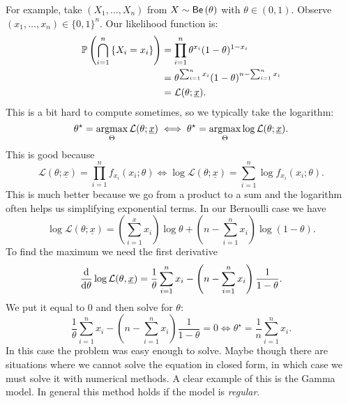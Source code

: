 \documentclass[12pt]{report}
\begin{document}
For example, take $(X_{1},\ldots,X_{n})$ from $X\sim\mathsf{Be}\left(\theta\right)$ with $\theta\in(0,1)$. Observe $(x_{1},\ldots,x_{n})\in\{0,1\}^{n}$. Our likelihood function is:
\begin{align*}
	\mathbb{P}\left(\bigcap_{i=1}^{n}\left\{X_{i}=x_{i}\right\}\right)&=\prod_{i=1}^{n}\theta^{x_{i}}(1-\theta)^{1-x_{i}}\\
	&=\theta^{\sum_{i=1}^{n}x_{i}}(1-\theta)^{n-\sum_{i=1}^{n}x_{i}}\\
	&=\mathcal{L}(\theta;\underline{x}).
\end{align*}
This is a bit hard to compute sometimes, so we typically take the logarithm:
\begin{equation*}
		\theta^{\star}=\operatorname*{argmax}_{\Theta}\mathcal{L}(\theta;\underline{x})\iff	\theta^{\star}=\operatorname*{argmax}_{\Theta}\log\mathcal{L}(\theta;\underline{x}).
\end{equation*}
This is good because
\begin{equation*}
	\mathcal{L}(\theta;\underline{x})=\prod_{i=1}^{n}f_{x_{i}}(x_{i};\theta)\iff\log\mathcal{L}(\theta;\underline{x})=\sum_{i=1}^{n}\log f_{x_{i}}(x_{i};\theta).
\end{equation*}
This is much better because we go from a product to a sum and the logarithm often helps us simplifying exponential terms. In our Bernoulli case we have
\begin{equation*}
	\log\mathcal{L}(\theta;\underline{x})=\left(\sum_{i=1}^{x}x_{i}\right)\log\theta+\left(n-\sum_{i=1}^{n}x_{i}\right)\log(1-\theta).
\end{equation*}
To find the maximum we need the first derivative
\begin{equation*}
	\frac{\mathop{}\!\mathrm{d}}{\mathop{}\!\mathrm{d}\theta}\log\mathcal{L}(\theta,\underline{x})=\frac{1}{\theta}\sum_{i=1}^{n}x_{i}-\left(n-\sum_{i=1}^{n}x_{i}\right)\frac{1}{1-\theta}.
\end{equation*}
We put it equal to 0 and then solve for $\theta$:
\begin{equation*}
	\frac{1}{\theta}\sum_{i=1}^{n}x_{i}-\left(n-\sum_{i=1}^{n}x_{i}\right)\frac{1}{1-\theta}=0\iff\theta^{\star}=\frac{1}{n}\sum_{i=1}^{n}x_{i}.
\end{equation*}
In this case the problem was easy enough to solve. Maybe though there are situations where we cannot solve the equation in closed form, in which case we must solve it with numerical methods. A clear example of this is the Gamma model. In general this method holds if the model is \emph{regular}.
\end{document}
